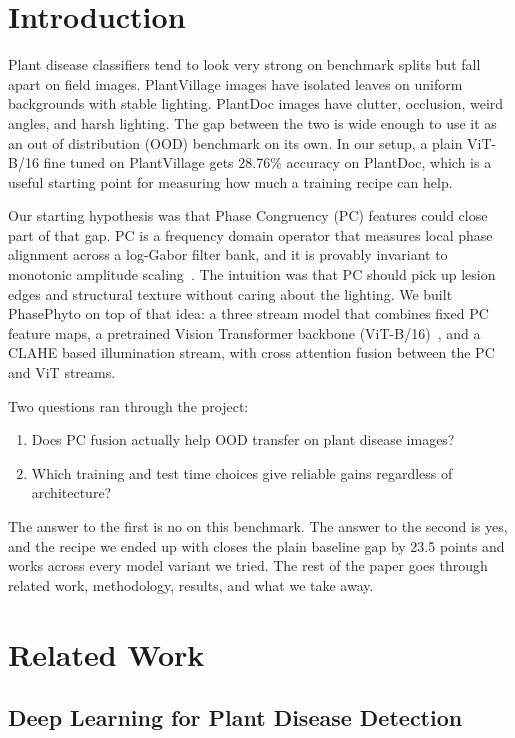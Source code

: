 \documentclass[conference]{IEEEtran}
\begin{document}
\section{Introduction}

Plant disease classifiers tend to look very strong on benchmark splits but fall apart on field images. PlantVillage images have isolated leaves on uniform backgrounds with stable lighting. PlantDoc images have clutter, occlusion, weird angles, and harsh lighting. The gap between the two is wide enough to use it as an out of distribution (OOD) benchmark on its own. In our setup, a plain ViT-B/16 fine tuned on PlantVillage gets 28.76\% accuracy on PlantDoc, which is a useful starting point for measuring how much a training recipe can help.

Our starting hypothesis was that Phase Congruency (PC) features could close part of that gap. PC is a frequency domain operator that measures local phase alignment across a log-Gabor filter bank, and it is provably invariant to monotonic amplitude scaling~\cite{Kovesi1999}. The intuition was that PC should pick up lesion edges and structural texture without caring about the lighting. We built PhasePhyto on top of that idea: a three stream model that combines fixed PC feature maps, a pretrained Vision Transformer backbone (ViT-B/16)~\cite{Dosovitskiy2021}, and a CLAHE based illumination stream, with cross attention fusion between the PC and ViT streams.

Two questions ran through the project:

\begin{enumerate}
    \item Does PC fusion actually help OOD transfer on plant disease images?
    \item Which training and test time choices give reliable gains regardless of architecture?
\end{enumerate}

The answer to the first is no on this benchmark. The answer to the second is yes, and the recipe we ended up with closes the plain baseline gap by 23.5 points and works across every model variant we tried. The rest of the paper goes through related work, methodology, results, and what we take away.

\section{Related Work}
\label{sec:related}

\subsection{Deep Learning for Plant Disease Detection}
\end{document}
